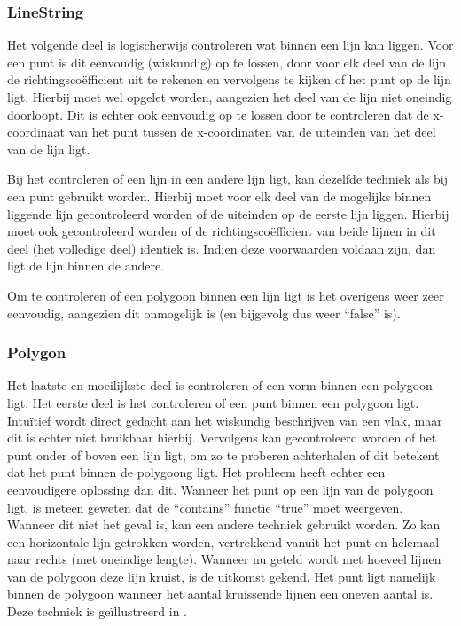 \subsubsection{LineString}
Het volgende deel is logischerwijs controleren wat binnen een lijn kan liggen. Voor een punt is dit eenvoudig (wiskundig) op te lossen, door voor elk deel van de lijn de richtingscoëfficient uit te rekenen en vervolgens te kijken of het punt op de lijn ligt. Hierbij moet wel opgelet worden, aangezien het deel van de lijn niet oneindig doorloopt. Dit is echter ook eenvoudig op te lossen door te controleren dat de x-coördinaat van het punt tussen de x-coördinaten van de uiteinden van het deel van de lijn ligt.

Bij het controleren of een lijn in een andere lijn ligt, kan dezelfde techniek als bij een punt gebruikt worden. Hierbij moet voor elk deel van de mogelijks binnen liggende lijn gecontroleerd worden of de uiteinden op de eerste lijn liggen. Hierbij moet ook gecontroleerd worden of de richtingscoëfficient van beide lijnen in dit deel (het volledige deel) identiek is. Indien deze voorwaarden voldaan zijn, dan ligt de lijn binnen de andere. 

Om te controleren of een polygoon binnen een lijn ligt is het overigens weer zeer eenvoudig, aangezien dit onmogelijk is (en bijgevolg dus weer ``false'' is).

\subsubsection{Polygon}
Het laatste en moeilijkste deel is controleren of een vorm binnen een polygoon ligt. Het eerste deel is het controleren of een punt binnen een polygoon ligt. Intuïtief wordt direct gedacht aan het wiskundig beschrijven van een vlak, maar dit is echter niet bruikbaar hierbij. Vervolgens kan gecontroleerd worden of het punt onder of boven een lijn ligt, om zo te proberen achterhalen of dit betekent dat het punt binnen de polygoong ligt. Het probleem heeft echter een eenvoudigere oplossing dan dit. Wanneer het punt op een lijn van de polygoon ligt, is meteen geweten dat de ``contains'' functie ``true'' moet weergeven. Wanneer dit niet het geval is, kan een andere techniek gebruikt worden. Zo kan een horizontale lijn getrokken worden, vertrekkend vanuit het punt en helemaal naar rechts (met oneindige lengte). Wanneer nu geteld wordt met hoeveel lijnen van de polygoon deze lijn kruist, is de uitkomst gekend. Het punt ligt namelijk binnen de polygoon wanneer het aantal kruissende lijnen een oneven aantal is. Deze techniek is geïllustreerd in .

